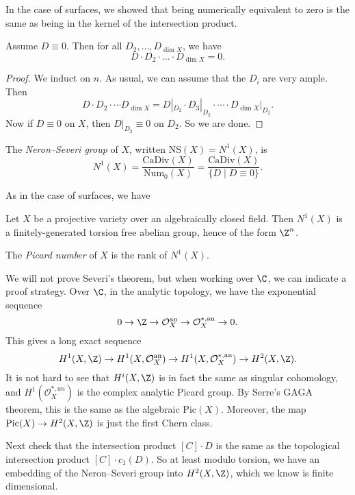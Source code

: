 \documentclass[a4paper]{article}
\newcommand\CaDiv{\mathrm{CaDiv}}
\newcommand\Pic{\mathrm{Pic}}
\newcommand\Num{\mathrm{Num}}
\newcommand\NS{\mathrm{NS}}
\begin{document}
In the case of surfaces, we showed that being numerically equivalent to zero is the same as being in the kernel of the intersection product.

\begin{lemma}
  Assume $D \equiv 0$. Then for all $D_2, \ldots, D_{\dim X}$, we have
  \[
    D \cdot D_2 \cdot \ldots \cdot D_{\dim X} = 0.
  \]
\end{lemma}

\begin{proof}
  We induct on $n$. As usual, we can assume that the $D_i$ are very ample. Then
  \[
    D \cdot D_2 \cdot \cdots D_{\dim X} = D|_{D_2} \cdot D_3|_{D_2} \cdot \cdots \cdot D_{\dim X}|_{D_2}.
  \]
  Now if $D \equiv 0$ on $X$, then $D|_{D_2} \equiv 0$ on $D_2$. So we are done.
\end{proof}

\begin{defi}
  The \emph{Neron--Severi group} of $X$, written $\NS(X) = N^1(X)$, is
  \[
    N^1(X) = \frac{\CaDiv(X)}{\Num_0(X)} = \frac{\CaDiv(X)}{\{D \mid D \equiv 0\}}.
  \]
\end{defi}

As in the case of surfaces, we have
\begin{thm}[Severi]
  Let $X$ be a projective variety over an algebraically closed field. Then $N^1(X)$ is a finitely-generated torsion free abelian group, hence of the form $\Z^n$.\fakeqed
\end{thm}

\begin{defi}
  The \emph{Picard number} of $X$ is the rank of $N^1(X)$.
\end{defi}

We will not prove Severi's theorem, but when working over $\C$, we can indicate a proof strategy. Over $\C$, in the analytic topology, we have the exponential sequence
\[
  0 \to \Z \to \mathcal{O}_X^{\mathrm{an}} \to \mathcal{O}_X^{*, \mathrm{an}} \to 0.
\]
This gives a long exact sequence
\[
  H^1(X, \Z) \to H^1(X, \mathcal{O}_X^{\mathrm{an}}) \to H^1(X, \mathcal{O}_X^{*, \mathrm{an}}) \to H^2(X, \Z).
\]
It is not hard to see that $H^i(X, \Z)$ is in fact the same as singular cohomology, and $H^1(\mathcal{O}_X^{*, an})$ is the complex analytic Picard group. By Serre's GAGA theorem, this is the same as the algebraic $\Pic(X)$. Moreover, the map $\Pic(X) \to H^2(X, \Z)$ is just the first Chern class.

Next check that the intersection product $[C]\cdot D$ is the same as the topological intersection product $[C] \cdot c_1(D)$. So at least modulo torsion, we have an embedding of the Neron--Severi group into $H^2(X, \Z)$, which we know is finite dimensional.
\end{document}
